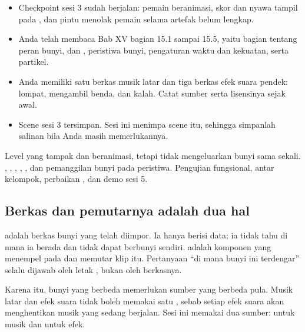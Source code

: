 \begin{prasyaratbox}
\begin{itemize}[leftmargin=1.4em, itemsep=0.25em]
  \item Checkpoint sesi 3 sudah berjalan: pemain beranimasi, skor dan nyawa
        tampil pada , dan pintu menolak pemain selama artefak
        belum lengkap.
  \item Anda telah membaca Bab XV bagian 15.1 sampai 15.5, yaitu bagian
        tentang peran bunyi,  dan ,
        peristiwa bunyi, pengaturan waktu dan kekuatan, serta partikel.
  \item Anda memiliki satu berkas musik latar dan tiga berkas efek suara
        pendek: lompat, mengambil benda, dan kalah. Catat sumber serta
        lisensinya sejak awal.
  \item Scene sesi 3 tersimpan. Sesi ini menimpa scene itu, sehingga simpanlah
        salinan bila Anda masih memerlukannya.
\end{itemize}
\end{prasyaratbox}


\petasesi
  {Level yang tampak dan beranimasi, tetapi tidak mengeluarkan bunyi sama
   sekali.}
  {, , ,
   , , dan pemanggilan bunyi pada peristiwa.}
  {Pengujian fungsional,  antar kelompok, perbaikan
   , dan demo sesi 5.}


\subsection*{Berkas dan pemutarnya adalah dua hal}

 adalah berkas bunyi yang telah diimpor. Ia hanya berisi
data; ia tidak tahu di mana ia berada dan tidak dapat berbunyi sendiri.
 adalah komponen yang menempel pada 
dan memutar klip itu. Pertanyaan ``di mana bunyi ini terdengar'' selalu
dijawab oleh letak , bukan oleh berkasnya.

Karena itu, bunyi yang berbeda memerlukan sumber yang berbeda pula. Musik
latar dan efek suara tidak boleh memakai satu , sebab setiap
efek suara akan menghentikan musik yang sedang berjalan. Sesi ini memakai dua
sumber:  untuk musik dan  untuk efek.

